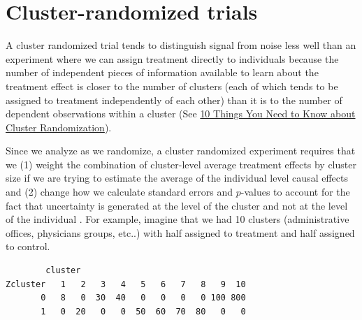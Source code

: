 \documentclass[
  12pt,
]{book}
\newenvironment{Shaded}{\begin{snugshade}}{\end{snugshade}}
\newcommand{\CommentTok}[1]{\textcolor[rgb]{0.56,0.35,0.01}{\textit{#1}}}
\newcommand{\DataTypeTok}[1]{\textcolor[rgb]{0.13,0.29,0.53}{#1}}
\newcommand{\DecValTok}[1]{\textcolor[rgb]{0.00,0.00,0.81}{#1}}
\newcommand{\KeywordTok}[1]{\textcolor[rgb]{0.13,0.29,0.53}{\textbf{#1}}}
\newcommand{\NormalTok}[1]{#1}
\newcommand{\OperatorTok}[1]{\textcolor[rgb]{0.81,0.36,0.00}{\textbf{#1}}}
\newcommand{\StringTok}[1]{\textcolor[rgb]{0.31,0.60,0.02}{#1}}
\theoremstyle{definition}
\theoremstyle{definition}
\theoremstyle{definition}
\theoremstyle{remark}
\begin{document}
\hypertarget{clusterrandanalysis}{%
\section{Cluster-randomized trials}\label{clusterrandanalysis}}

A cluster randomized trial tends to distinguish signal from noise less
well than an experiment where we can assign treatment directly to
individuals because the number of independent pieces of information
available to learn about the treatment effect is closer to the number of
clusters (each of which tends to be assigned to treatment independently
of each other) than it is to the number of dependent observations within
a cluster (See
\href{https://egap.org/methods-guides/10-things-you-need-know-about-cluster-randomization}{10
Things You Need to Know about Cluster Randomization}).

Since we analyze as we randomize, a cluster randomized experiment
requires that we (1) weight the combination of cluster-level average
treatment effects by cluster size if we are trying to estimate the
average of the individual level causal effects
\citep{middleton2015unbiased} and (2) change how we calculate standard
errors and \(p\)-values to account for the fact that uncertainty is
generated at the level of the cluster and not at the level of the
individual \citep{hansen_covariate_2008, gerber_field_2012}. For
example, imagine that we had 10 clusters (administrative offices,
physicians groups, etc..) with half assigned to treatment and half
assigned to control.

\begin{Shaded}
\end{Shaded}

\begin{verbatim}
        cluster
Zcluster   1   2   3   4   5   6   7   8   9  10
       0   8   0  30  40   0   0   0   0 100 800
       1   0  20   0   0  50  60  70  80   0   0
\end{verbatim}
\end{document}
